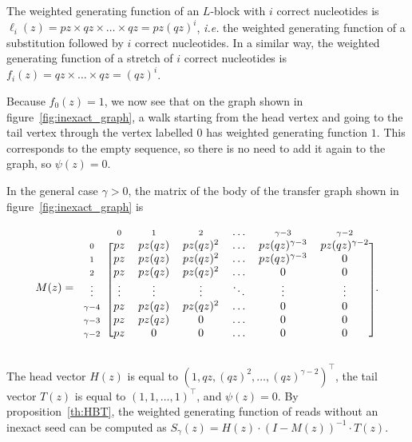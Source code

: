 \documentclass{article}
\begin{document}
The weighted generating function of an $L$-block with $i$ correct
nucleotides is $\ell_i(z) = pz \times qz \times \ldots \times qz =
pz(qz)^i$, \textit{i.e.} the weighted generating function of a
substitution followed by $i$ correct nucleotides. In a similar way, the
weighted generating function of a stretch of $i$ correct nucleotides is
$f_i(z) = qz \times \ldots \times qz = (qz)^i$.

Because $f_0(z) = 1$, we now see that on the graph shown in
figure~\ref{fig:inexact_graph}, a walk starting from the head vertex and
going to the tail vertex through the vertex labelled $0$ has weighted
generating function $1$. This corresponds to the empty sequence, so there
is no need to add it again to the graph, so $\psi(z) = 0$.

In the general case $\gamma > 0$, the matrix of the body of the transfer
graph shown in figure~\ref{fig:inexact_graph} is

\begin{equation*}
M(z) = 
\begin{blockarray}{ccccccc}
       & \scriptstyle{0} & \scriptstyle{1} & \scriptstyle{2} &
    \ldots &  \scriptstyle{\gamma-3} & \scriptstyle{\gamma-2} \\
\begin{block}{c[cccccc]}
\scriptstyle{0} & pz  & pz(qz) & pz(qz)^2 & \ldots &
    pz(qz)^{\gamma-3} & pz(qz)^{\gamma-2} \\
\scriptstyle{1} & pz  & pz(qz) & pz(qz)^2 & \ldots &
    pz(qz)^{\gamma-3} & 0 \\
\scriptstyle{2} & pz  & pz(qz) & pz(qz)^2 & \ldots &
    0 & 0 \\
\vdots & \vdots  & \vdots & \vdots & \ddots & \vdots & \vdots  \\
\scriptstyle{\gamma-4} & pz  & pz(qz) & pz(qz)^2 & \ldots & 0 & 0 \\
\scriptstyle{\gamma-3} & pz  & pz(qz) & 0 & \ldots & 0 & 0 \\
\scriptstyle{\gamma-2} & pz  & 0      & 0 & \ldots & 0 & 0 \\
\end{block}
\end{blockarray}.
\end{equation*}


The head vector $H(z)$ is equal to $(1, qz, (qz)^2, \ldots,
(qz)^{\gamma-2})^\top$, the tail vector $T(z)$ is equal to $(1,1, \ldots,
1)^\top$, and $\psi(z) = 0$. By proposition~\ref{th:HBT}, the weighted
generating function of reads without an inexact seed can be computed as
$S_\gamma(z) = H(z) \cdot (I-M(z))^{-1} \cdot T(z)$.
\end{document}

